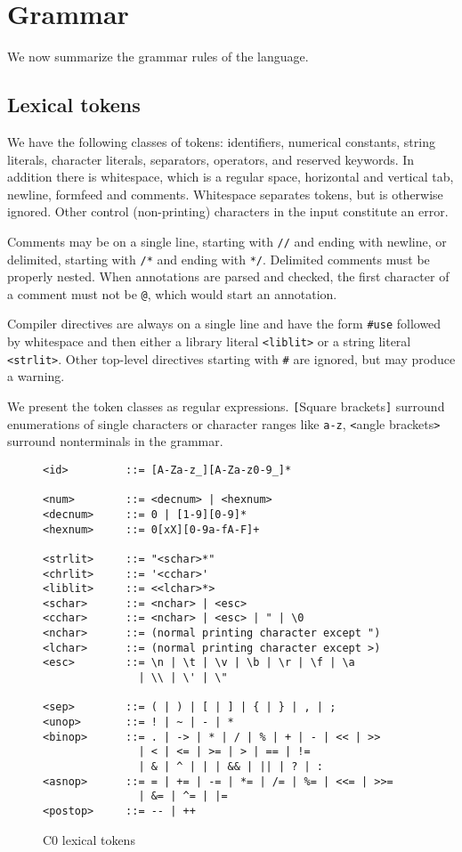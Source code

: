 \documentclass[11pt]{article}
\begin{document}
\section{Grammar}

We now summarize the grammar rules of the language.

\subsection{Lexical tokens}

We have the following classes of tokens: identifiers, numerical
constants, string literals, character literals, separators, operators,
and reserved keywords.  In addition there is whitespace, which is
a regular space, horizontal and vertical tab, newline, formfeed
and comments.  Whitespace separates tokens, but is otherwise
ignored.  Other control (non-printing) characters in the input
constitute an error.

Comments may be on a single line, starting with \verb'//'
and ending with newline, or delimited, starting with
\verb'/*' and ending with \verb'*/'.  Delimited comments
must be properly nested.  When annotations are parsed and
checked, the first character of a comment must not be
\verb'@', which would start an annotation.

Compiler directives are always on a single line and have the form
\verb'#use' followed by whitespace and then either a library literal
\verb'<liblit>' or a string literal \verb'<strlit>'.  Other
top-level directives starting with \verb'#' are ignored, but
may produce a warning.

We present the token classes as regular expressions.  \verb'['Square
brackets\verb']' surround enumerations of single characters or
character ranges like \verb'a-z', \verb'<'angle brackets\verb'>'
surround nonterminals in the grammar.

\begin{figure}
\begin{small}
\begin{verbatim}
<id>         ::= [A-Za-z_][A-Za-z0-9_]*

<num>        ::= <decnum> | <hexnum>
<decnum>     ::= 0 | [1-9][0-9]*
<hexnum>     ::= 0[xX][0-9a-fA-F]+

<strlit>     ::= "<schar>*"
<chrlit>     ::= '<cchar>'
<liblit>     ::= <<lchar>*>
<schar>      ::= <nchar> | <esc>
<cchar>      ::= <nchar> | <esc> | " | \0
<nchar>      ::= (normal printing character except ")
<lchar>      ::= (normal printing character except >)
<esc>        ::= \n | \t | \v | \b | \r | \f | \a 
               | \\ | \' | \"

<sep>        ::= ( | ) | [ | ] | { | } | , | ;
<unop>       ::= ! | ~ | - | *
<binop>      ::= . | -> | * | / | % | + | - | << | >> 
               | < | <= | >= | > | == | !=
               | & | ^ | | | && | || | ? | :
<asnop>      ::= = | += | -= | *= | /= | %= | <<= | >>=
               | &= | ^= | |=
<postop>     ::= -- | ++
\end{verbatim}
\end{small}
\caption{C0 lexical tokens}
\label{fig:tokens}
\end{figure}
\end{document}
